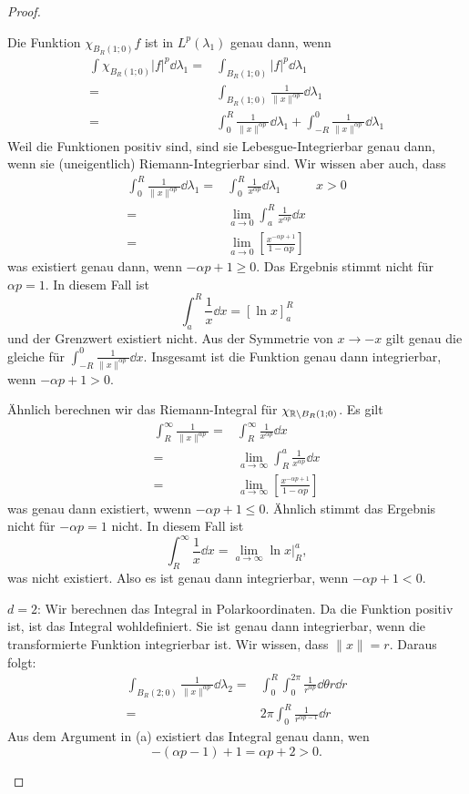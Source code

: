 \begin{proof}
	\begin{parts}
	\item Die Funktion $\chi_{B_R(1;0)}f$ ist in $L^p(\lambda_1)$ genau dann, wenn
	\begin{align*}
		\int \chi_{B_R(1;0)}|f|^p \dd{\lambda_1}=&\int_{B_R(1;0)} |f|^p \dd{\lambda_1}\\
		=&\int_{B_R(1;0)}\frac{1}{\|x\|^{\alpha p}}\dd{\lambda_1}\\
		=&\int_0^R \frac{1}{\|x\|^{\alpha p}}\dd{\lambda_1}+\int_{-R}^0 \frac{1}{\|x\|^{\alpha p}}\dd{\lambda_1}
	\end{align*}
	Weil die Funktionen positiv sind, sind sie Lebesgue-Integrierbar genau dann, wenn sie (uneigentlich) Riemann-Integrierbar sind. Wir wissen aber auch, dass
	\begin{align*}
		\int_0^R \frac{1}{\|x\|^{\alpha p}}\dd{\lambda_1}=&\int_0^R \frac{1}{x^{\alpha p}}\dd{\lambda_1} & x>0\\
		=&\lim_{a \to 0} \int_a^R \frac{1}{x^{\alpha p}}\dd{x}\\
		=&\lim_{a \to 0}\left[ \frac{x^{-\alpha p + 1}}{1-\alpha p} \right] 
	\end{align*}
	was existiert genau dann, wenn $-\alpha p + 1 \ge 0$. Das Ergebnis stimmt nicht f\"{u}r $\alpha p=1$. In diesem Fall ist
	\[
		\int_a^R \frac{1}{x}\dd{x}=[\ln x]_a^R
	\]
	und der Grenzwert existiert nicht. Aus der Symmetrie von $x\to -x$ gilt genau die gleiche f\"{u}r $\int_{-R}^0 \frac{1}{\|x\|^{\alpha p}}\dd{x}$. Insgesamt ist die Funktion genau dann integrierbar, wenn $-\alpha p + 1 >0$. 

	Ähnlich berechnen wir das Riemann-Integral f\"{u}r $\chi_{\mathbb{R}\backslash B_R(1;0)}$. Es gilt
	\begin{align*}
		\int_R^\infty \frac{1}{\|x\|^{\alpha p}}=&\int_R^\infty \frac{1}{x^{\alpha p}}\dd{x}\\
		=&\lim_{a \to \infty} \int_R^a \frac{1}{x^{\alpha p}}\dd{x}\\
		=&\lim_{a \to \infty} \left[ \frac{x^{-\alpha p+1}}{1-\alpha p} \right]
	\end{align*}
	was genau dann existiert, wwenn $-\alpha p + 1\le 0$. Ähnlich stimmt das Ergebnis nicht f\"{u}r $-\alpha p = 1$ nicht. In diesem Fall ist
	\[
		\int_R^\infty \frac{1}{x}\dd{x}=\lim_{a \to \infty} \ln x |_R^a
	,\]
	was nicht existiert. Also es ist genau dann integrierbar, wenn $-\alpha p + 1 < 0$.
\item $d=2$: Wir berechnen das Integral in Polarkoordinaten. Da die Funktion positiv ist, ist das Integral wohldefiniert. Sie ist genau dann integrierbar, wenn die transformierte Funktion integrierbar ist. Wir wissen, dass $\|x\|=r$. Daraus folgt:
	\begin{align*}
		\int_{B_R(2;0)} \frac{1}{\|x\|^{\alpha p}}\dd{\lambda_2}=&\int_0^R\int_0^{2\pi} \frac{1}{r^{\alpha p}}\dd{\theta}r\dd{r}\\
		=& 2\pi\int_0^R \frac{1}{r^{\alpha p-1}}\dd{r}
	\end{align*}
	Aus dem Argument in (a) existiert das Integral genau dann, wen
	\[
		-(\alpha p - 1)+1=\alpha p+2>0
	.\] 
	\end{parts}
\end{proof}
